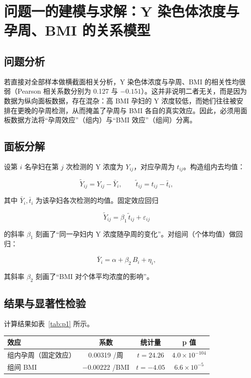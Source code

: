 \section{问题一的建模与求解：Y 染色体浓度与孕周、BMI 的关系模型}

\subsection{问题分析}

若直接对全部样本做横截面相关分析，Y 染色体浓度与孕周、BMI 的相关性均很弱（Pearson 相关系数分别为 0.127 与 $-0.151$）。这并非说明二者无关，而是因为数据为纵向面板数据，存在混杂：高 BMI 孕妇的 Y 浓度较低，而她们往往被安排在更晚的孕周检测，从而掩盖了孕周与 BMI 各自的真实效应。因此，必须用面板数据方法将``孕周效应''（组内）与``BMI 效应''（组间）分离。

\subsection{面板分解}

设第 $i$ 名孕妇在第 $j$ 次检测的 Y 浓度为 $Y_{ij}$，对应孕周为 $t_{ij}$。构造组内去均值：

\begin{equation}
  \tilde{Y}_{ij}=Y_{ij}-\bar{Y}_i,\qquad \tilde{t}_{ij}=t_{ij}-\bar{t}_i,
\end{equation}

其中 $\bar{Y}_i,\bar{t}_i$ 为该孕妇各次检测的均值。固定效应回归

\begin{equation}
  \tilde{Y}_{ij}=\beta_1\,\tilde{t}_{ij}+\varepsilon_{ij}
\end{equation}

的斜率 $\beta_1$ 刻画了``同一孕妇内 Y 浓度随孕周的变化''。对组间（个体均值）做回归：

\begin{equation}
  \bar{Y}_i=\alpha+\beta_2\,B_i+\eta_i,
\end{equation}

其斜率 $\beta_2$ 刻画了``BMI 对个体平均浓度的影响''。

\subsection{结果与显著性检验}

计算结果如表~\ref{tab:p1} 所示。

\begin{center}
\begin{tabular}{lccc}
\toprule
\textbf{效应} & \textbf{系数} & \textbf{统计量} & \textbf{p 值} \\
\midrule
组内孕周（固定效应） & 0.00319 /周 & $t=24.26$ & $4.0\times 10^{-104}$ \\
组间 BMI & $-0.00222$ /BMI & $t=-4.05$ & $6.6\times 10^{-5}$ \\
\bottomrule
\end{tabular}
\label{tab:p1}
\end{center}

